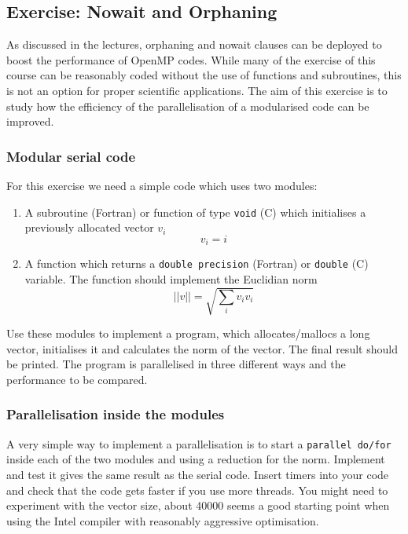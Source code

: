 \subsection{Exercise: Nowait and Orphaning}
As discussed in the lectures, orphaning and nowait clauses can be deployed to boost the performance of OpenMP codes.  While many of the exercise of this course can be reasonably coded without the use of functions and subroutines, this is not an option for proper scientific applications.  The aim of this exercise is to study how the efficiency of the parallelisation of a modularised code can be improved.

\subsubsection{Modular serial code}
For this exercise we need a simple code which uses two modules:
\begin{enumerate}

\item A subroutine (Fortran) or function of type \verb+void+ (C) which initialises a previously allocated vector $v_i$
\begin{equation}
v_i = i
\end{equation}

\item A function which returns a \verb+double precision+ (Fortran) or \verb+double+ (C) variable.  The function should implement the Euclidian norm
\begin{equation}
|| v || = \sqrt{\sum_i v_i v_i}
\end{equation}

\end{enumerate}

Use these modules to implement a program, which allocates/mallocs a long vector, initialises it and calculates the norm of the vector.  The final result should be printed.  The program is parallelised in three different ways and the performance to be compared.

\subsubsection{Parallelisation inside the modules}
A very simple way to implement a parallelisation is to start a \verb+parallel do/for+ 
inside each of the two modules and using a reduction for the norm.  Implement and test it gives the same result as the serial code.  Insert timers into your code and check that the code gets faster if you use more threads.  You might need to experiment with the vector size, about 40000 seems a good starting point when using the Intel compiler with reasonably aggressive optimisation.    

